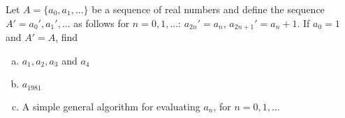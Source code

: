 Let $A = \lbrace a_0, a_1, ... \rbrace$ be a sequence of real numbers and
define the sequence $A' = {a_0', a_1', ...}$ as follows for $n = 0, 1, ...$:
$a_{2n}' = a_n$, $a_{2n + 1}' = a_n + 1$. If $a_0 = 1$ and $A' = A$, find

\begin{enumerate}[(a)]

\item $a_1, a_2, a_3$ and $a_4$
\item $a_{1981}$
\item A simple general algorithm for evaluating $a_n$, for $n = 0, 1, ...$

\end{enumerate}
